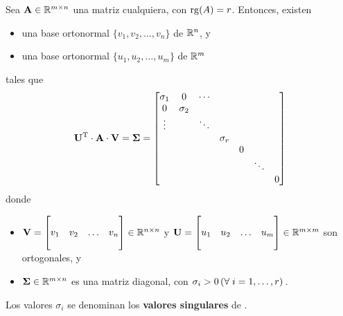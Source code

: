 Sea $\mathbf{A} \in \mathbb{R}^{m \times n}$ una matriz cualquiera, con $\operatorname{rg}(A) = r$.
Entonces, existen
\begin{itemize}
\item una base ortonormal $\lbrace v_1, v_2, \dots, v_n \rbrace$ de $\mathbb{R}^n$, y
\item una base ortonormal $\lbrace u_1, u_2, \dots, u_m \rbrace$ de $\mathbb{R}^m$
\end{itemize}
tales que
\[ \mathbf{U}^{\mathrm{T}} \cdot \mathbf{A} \cdot \mathbf{V} = \mathbf{\Sigma} = \begin{bmatrix}
\sigma_1 & 0        & \cdots   &    &          &          &          \\
0        & \sigma_2 &          &          &          &          &          \\
\vdots   &          & \ddots   &          &          &          &          \\
         &          &          & \sigma_r &          &          &          \\
         &          &          &          & 0        &          &          \\
         &          &          &          &          & \ddots   &          \\
         &          &          &          &          &          & 0
\end{bmatrix} \]
donde
\begin{itemize}
\item $\mathbf{V} = \begin{bmatrix}
            &     &        &     \\
        v_1 & v_2 & \dots  & v_n \\
            &     &        &     \\
    \end{bmatrix} \in \mathbb{R}^{n \times n}$ y
    $\mathbf{U} = \begin{bmatrix}
            &     &        &     \\
        u_1 & u_2 & \dots  & u_m \\
            &     &        &     \\
    \end{bmatrix} \in \mathbb{R}^{m \times m}$ son ortogonales, y
\item $\mathbf{\Sigma} \in \mathbb{R}^{m \times n}$ es una matriz diagonal,
    con $\sigma_i > 0 \left(\forall\;i = 1, \dots, r\right)\,$.
\end{itemize}

Los valores $\sigma_i$ se denominan los \textbf{valores singulares} de .


